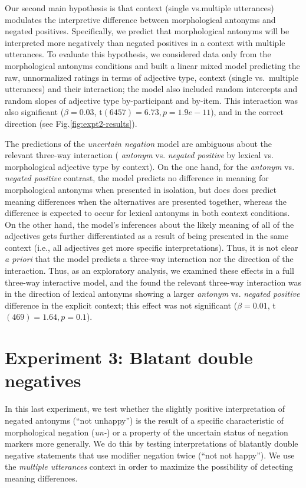 \documentclass[floatsintext,doc]{apa6}
\begin{document}
Our second main hypothesis is that context (single vs.\text{~}multiple utterances) modulates the interpretive difference between morphological antonyms and negated positives.
Specifically, we predict that morphological antonyms will be interpreted more negatively than negated positives in a context with multiple utterances.
To evaluate this hypothesis, we considered data only from the morphological antonyms conditions and built a linear mixed model predicting the raw, unnormalized ratings in terms of adjective type,
context (single vs.~multiple utterances) and their interaction; the model also included random intercepts and random slopes of adjective type by-participant and by-item.
This interaction was also significant (\(\beta = 0.03\), t\((6457) = 6.73, p = 1.9e-11\)), and in the correct direction (see Fig.\text{~}\ref{fig:expt2-results}).

The predictions of the \emph{uncertain negation} model are ambiguous about the relevant three-way interaction ( \emph{antonym} vs. \emph{negated positive} by lexical vs. morphological adjective type by context).
On the one hand, for the \emph{antonym} vs. \emph{negated positive} contrast, the model predicts no difference in meaning for morphological antonyms when presented in isolation, but does does predict meaning differences when the alternatives are presented together, whereas the difference is expected to occur for lexical antonyms in both context conditions.
On the other hand, the model's inferences about the likely meaning of all of the adjectives gets further differentiated as a result of being presented in the same context (i.e., all adjectives get more specific interpretations).
Thus, it is not clear \emph{a priori} that the model predicts a three-way interaction nor the direction of the interaction.
Thus, as an exploratory analysis, we examined these effects in a full three-way interactive model, and the found the relevant three-way interaction was in the direction of lexical antonyms showing a larger \emph{antonym} vs. \emph{negated positive} difference in the explicit context; this effect was not significant (\(\beta = 0.01\), t\((469) = 1.64, p = 0.1\)).

\section{Experiment 3: Blatant double negatives}\label{experiment-3-notnot}

In this last experiment, we test whether the slightly positive interpretation of negated antonyms (``not unhappy'') is the result of a specific characteristic of morphological negation (\emph{un-}) or a property of the uncertain status of negation markers more generally. 
We do this by testing interpretations of blatantly double negative statements that use modifier negation twice (``not not happy'').
We use the \emph{multiple utterances} context in order to maximize the possibility of detecting meaning differences. 
\end{document}
